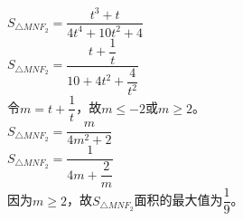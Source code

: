 \documentclass[UTF8]{ctexart}
\begin{document}
\begin{multicols}{2}
        $S_{\triangle MNF_{2}}=\dfrac{t^3+t}{4t^4+10t^2+4}$\\[5mm]
        $S_{\triangle MNF_{2}}=\dfrac{t+\dfrac{1}{t}}{10+4t^2+\dfrac{4}{t^2}}$\\[8mm]
        令$m=t+\dfrac{1}{t}$，故$m\leq -2$或$m\geq 2$。\\[5mm]
        $S_{\triangle MNF_{2}}=\dfrac{m}{4m^2+2}$\\[5mm]
        $S_{\triangle MNF_{2}}=\dfrac{1}{4m+\dfrac{2}{m}}$\\[2mm]
        因为$m\geq 2$，故$S_{\triangle MNF_{2}}$面积的最大值为$\dfrac{1}{9}$。
        \newpage
    \end{multicols}
\end{document}
